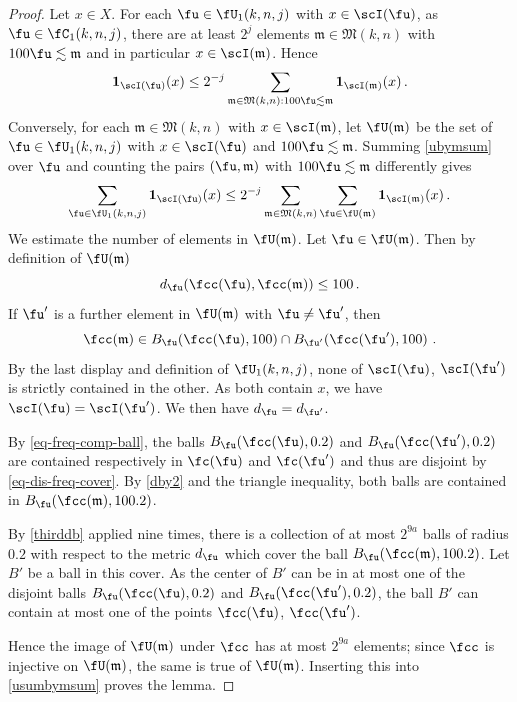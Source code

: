 \begin{proof}
\leanok
Let $x\in X$. For each
$\fu\in \fU_1(k,n,j)$ with $x\in \scI(\fu)$, as $\fu \in \fC_1(k,n,j)$,
there are at least $2^{j}$ elements $\mathfrak{m}\in \mathfrak{M}(k,n)$
with $100\fu \lesssim \mathfrak{m}$ and in particular
$x\in \scI(\mathfrak{m})$. Hence
\begin{equation}\label{ubymsum}
     \mathbf{1}_{\scI(\fu)}(x)
    \le 2^{-j}\sum_{\mathfrak{m} \in \mathfrak{M}(k,n): 100\fu\lesssim \mathfrak{m}} \mathbf{1}_{\scI(\mathfrak{m})}(x)\, .
\end{equation}
Conversely, for each $\mathfrak{m}\in \mathfrak{M}(k,n)$
with $x\in \scI(\mathfrak{m})$,
let $\fU(\mathfrak{m})$ be the set of
$\fu\in \fU_1(k,n,j)$ with $x\in \scI(\fu)$
and $100\fu \lesssim \mathfrak{m}$.
Summing \eqref{ubymsum} over $\fu$ and counting the pairs
$(\fu,\mathfrak{m})$ with $100\fu \lesssim \mathfrak{m}$
differently gives
\begin{equation}\label{usumbymsum}
     \sum_{\fu\in \fU_1(k,n,j)} \mathbf{1}_{\scI(\fu)}(x)
    \le 2^{-j}\sum_{\mathfrak{m} \in \mathfrak{M}(k,n)}
    \sum_{\fu \in \fU(\mathfrak{m})} \mathbf{1}_{\scI(\mathfrak{m})}(x)\, .
\end{equation}
We estimate the number of elements in $\fU(\mathfrak{m})$.
Let $\fu \in \fU(\mathfrak{m})$.
Then by definition of
$\fU(\mathfrak{m})$
\begin{equation}\label{dby2}
     d_{\fu}(\fcc(\fu),\fcc(\mathfrak{m}))\le 100\, .
\end{equation}
If $\fu'$ is a further element in $\fU(\mathfrak{m})$ with $\fu\neq \fu'$, then
\begin{equation}
    \fcc(\mathfrak{m})
    \in B_{\fu}(\fcc(\fu),100)\cap B_{\fu'}(\fcc(\fu'),100)\ .
\end{equation}
By the last display and definition of $\fU_1(k,n,j)$, none of $\scI(\fu)$, $\scI(\fu')$ is strictly contained in the other. As both contain $x$, we have $\scI(\fu)=\scI(\fu')$.
We then have $d_{\fu}=d_{\fu'}$.

By \eqref{eq-freq-comp-ball}, the balls
$B_{\fu}(\fcc(\fu),0.2)$ and
$B_{\fu}(\fcc(\fu'),0.2)$ are
contained respectively in $\fc(\fu)$
and $\fc(\fu')$ and thus are disjoint by \eqref{eq-dis-freq-cover}.
By \eqref{dby2} and the triangle inequality, both balls are contained in $B_{\fu}(\fcc(\mathfrak{m}), 100.2)$.

By \eqref{thirddb} applied nine times, there is a collection of at most
$2^{9a}$ balls of radius $0.2$ with respect to the metric $d_{\fu}$ which cover the ball $B_{\fu}(\fcc(\mathfrak{m}),100.2)$.
Let $B'$ be a ball in this cover.
As the center of $B'$ can be in at most one of the disjoint balls
$B_{\fu}(\fcc(\fu),0.2)$ and
$B_{\fu}(\fcc(\fu'),0.2)$,
the ball $B'$ can contain at most
one of the points $\fcc(\fu)$, $\fcc(\fu')$.

Hence the image of $\fU(\mathfrak{m})$ under $\fcc$ has at most
$2^{9a}$ elements; since $\fcc$ is injective on $\fU(\mathfrak{m})$,
the same is true of $\fU(\mathfrak{m})$.
Inserting this into \eqref{usumbymsum} proves the lemma.
\end{proof}

